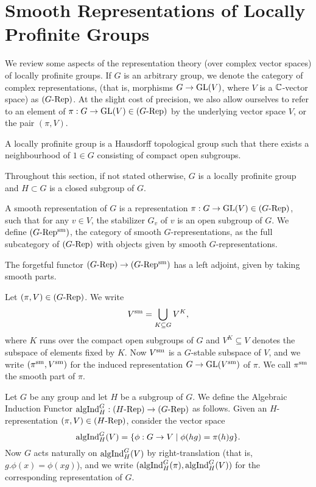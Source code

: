 \documentclass[../main.tex]{subfiles}
\begin{document}
\section{Smooth Representations of Locally Profinite Groups}
We review some aspects of the representation theory (over complex vector spaces)
of locally profinite groups. 
If $G$ is an arbitrary group, we denote the category of complex representations,
(that is, morphisms $G \to \operatorname{GL}(V)$, where $V$ is a $\mathbb{C}$-vector space) as
${({G}\text-\allowbreak\mathrm{Rep})}$. At the slight cost of precision, we also allow ourselves to refer to
an element of $\pi: G \to \operatorname{GL}(V) \in {({G}\text-\allowbreak\mathrm{Rep})}$ by the underlying vector space
$V$, or the pair $(\pi, V)$. 

\begin{defi}
  A locally profinite group is a Hausdorff topological group such that there exists 
  a neighbourhood of $1 \in G$ consisting of compact open subgroups.
\end{defi}
Throughout this section, if not stated otherwise, $G$ is a locally profinite
group and $H \subset G$ is a closed subgroup of $G$.

\begin{defi}
  A smooth representation of $G$ is a
  representation $\pi: G \to \operatorname{GL}(V) \in {({G}\text-\allowbreak\mathrm{Rep})}$,
  such that for any $v \in V$, the stabilizer $G_v$ of $v$ is an open subgroup
  of $G$. We define ${({G}\text-\allowbreak\mathrm{Rep^{\mathrm{sm}}})}$, the category of smooth $G$-representations, as
  the full subcategory of ${({G}\text-\allowbreak\mathrm{Rep})}$ with objects given by smooth
  $G$-representations.
\end{defi}

The forgetful functor ${({G}\text-\allowbreak\mathrm{Rep})} \to {({G}\text-\allowbreak\mathrm{Rep^{\mathrm{sm}}})}$ has a left adjoint, given by taking
smooth parts. 
\begin{defi}
  Let $(\pi,V) \in {({G}\text-\allowbreak\mathrm{Rep})}$. We write 
  \begin{equation*}
    V^{\mathrm{sm}} = \bigcup_{K \subseteq G} V^K,
  \end{equation*}
  where $K$ runs over the compact open subgroups of $G$ and $V^K \subseteq V$
  denotes the subspace of elements fixed by $K$. 
  Now $V^{\mathrm{sm}}$ is a $G$-stable subspace of $V$, and we write $(\pi^{\mathrm{sm}}, V^{\mathrm{sm}})$ 
  for the induced representation $G \to \operatorname{GL}(V^{\mathrm{sm}})$ of $\pi$.
  We call $\pi^{\mathrm{sm}}$ the smooth part of $\pi$.
\end{defi}

\begin{defi}
  Let $G$ be any group and let $H$ be a subgroup of $G$. We define the Algebraic
  Induction Functor $\mathrm{algInd}_H^G: {({H}\text-\allowbreak\mathrm{Rep})} \to {({G}\text-\allowbreak\mathrm{Rep})}$ as follows. Given an
  $H$-representation $(\pi, V)\in {({H}\text-\allowbreak\mathrm{Rep})}$, consider the vector space
  \begin{equation*}
    \mathrm{algInd}_H^G(V) = \{\phi: G \to V \mid \phi(hg) = \pi(h) g\}.
  \end{equation*}
  Now $G$ acts naturally on $\mathrm{algInd}_H^G(V)$ by right-translation (that is, 
  $g.\phi(x) = \phi(xg)$), and we write
  $(\mathrm{algInd}_H^G(\pi),\mathrm{algInd}_H^G(V))$ for the corresponding representation of $G$.
\end{defi}
\end{document}
